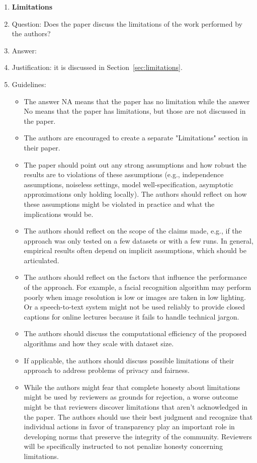 \documentclass{article}
\begin{document}
{\begin{enumerate}
\item {\bf Limitations}
    \item[] Question: Does the paper discuss the limitations of the work performed by the authors?
    \item[] Answer: \answerYes{} %
    \item[] Justification: it is discussed in Section~\ref{sec:limitations}.
    \item[] Guidelines:
    \begin{itemize}
        \item The answer NA means that the paper has no limitation while the answer No means that the paper has limitations, but those are not discussed in the paper. 
        \item The authors are encouraged to create a separate "Limitations" section in their paper.
        \item The paper should point out any strong assumptions and how robust the results are to violations of these assumptions (e.g., independence assumptions, noiseless settings, model well-specification, asymptotic approximations only holding locally). The authors should reflect on how these assumptions might be violated in practice and what the implications would be.
        \item The authors should reflect on the scope of the claims made, e.g., if the approach was only tested on a few datasets or with a few runs. In general, empirical results often depend on implicit assumptions, which should be articulated.
        \item The authors should reflect on the factors that influence the performance of the approach. For example, a facial recognition algorithm may perform poorly when image resolution is low or images are taken in low lighting. Or a speech-to-text system might not be used reliably to provide closed captions for online lectures because it fails to handle technical jargon.
        \item The authors should discuss the computational efficiency of the proposed algorithms and how they scale with dataset size.
        \item If applicable, the authors should discuss possible limitations of their approach to address problems of privacy and fairness.
        \item While the authors might fear that complete honesty about limitations might be used by reviewers as grounds for rejection, a worse outcome might be that reviewers discover limitations that aren't acknowledged in the paper. The authors should use their best judgment and recognize that individual actions in favor of transparency play an important role in developing norms that preserve the integrity of the community. Reviewers will be specifically instructed to not penalize honesty concerning limitations.
    \end{itemize}


\end{enumerate}}
\end{document}
